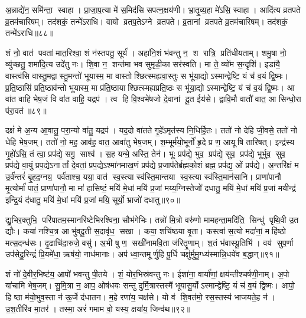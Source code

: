 अ॒न्नाद्ये॑न॒ समि॑न्ता॒ स्वाहा। प्रा॒जा॒प॒त्या मे॑ स॒मिद॑सि सपत्न॒क्षय॑णी। भ्रा॒तृ॒व्य॒हा मे॑ऽसि॒ स्वाहा। आदि॑त्य व्रतपते व्र॒तम॑चारिषम्। तद॑शकं॒ तन्मे॑ऽराधि। वायो व्रतप॒तेऽग्ने व्रतपते। व्र॒तानां व्रतपते व्र॒तम॑चारिषम्। तद॑शकं॒ तन्मे॑ऽराधि॥८८॥
\anuvakamend[स॒मित्समि॑न्धे व्र॒तं च॑रिष्या॒म्यायु॑षा॒ तेज॑सा॒ वर्च॑सा श्रि॒या यश॑सा ब्रह्मवर्च॒सेना॒ष्टौ च॑]


शं नो॒ वात॑ पवतां मात॒रिश्वा॒ शं न॑स्तपतु॒ सूर्य॑। अहा॑नि॒शं भ॑वन्तु न॒ श रात्रि॒ प्रति॑धीयताम्। शमु॒षा नो॒ व्यु॑च्छतु॒ शमा॑दि॒त्य उदे॑तु नः। शि॒वा न॒ शन्त॑मा भव सुमृडी॒का सर॑स्वति। मा ते॒ व्यो॑म स॒न्दृशि॑। इडा॑यै॒ वास्त्व॑सि वास्तु॒मद्वास्तु॒मन्तो॑ भूयास्म॒ मा वास्तोश्छित्स्मह्यवा॒स्तुः स भू॑या॒द्योऽस्मान्द्वेष्टि॒ यं च॑ व॒यं द्वि॒ष्मः। प्र॒ति॒ष्ठासि॑ प्रति॒ष्ठाव॑न्तो भूयास्म॒ मा प्र॑ति॒ष्ठायाश्छित्स्मह्यप्रति॒ष्ठः स भू॑या॒द्योऽस्मान्द्वेष्टि॒ यं च॑ व॒यं द्वि॒ष्मः। आ वा॑त वाहि भेष॒जं वि वा॑त वाहि॒ यद्रप॑। त्व हि वि॒श्वभे॑षजो दे॒वानां दू॒त ईय॑से। द्वावि॒मौ वातौ॑ वात॒ आ सिन्धो॒रा प॑रा॒वत॑॥८९॥

दक्षं॑ मे अ॒न्य आ॒वातु॒ परा॒न्यो वा॑तु॒ यद्रप॑। यद॒दो वा॑तते गृ॒हे॑ऽमृत॑स्य नि॒धिर्\mbox{}हि॒तः। ततो॑ नो देहि जी॒वसे॒ ततो॑ नो धेहि भेष॒जम्। ततो॑ नो॒ मह॒ आव॑ह॒ वात॒ आवा॑तु भेष॒जम्। श॒म्भूर्म॑यो॒भूर्नो॑ हृ॒दे प्र ण॒ आयूषि तारिषत्। इन्द्र॑स्य गृ॒हो॑ऽसि॒ तं त्वा॒ प्रप॑द्ये॒ सगु॒ साश्व॑। स॒ह यन्मे॒ अस्ति॒ तेन॑। भूः प्रप॑द्ये॒ भुव॒ प्रप॑द्ये॒ सुव॒ प्रप॑द्ये॒ भूर्भुव॒ सुव॒ प्रप॑द्ये वा॒युं प्रप॒द्येऽनार्तां दे॒वतां॒ प्रप॒द्येऽश्मा॑नमाख॒णं प्रप॑द्ये प्र॒जाप॑तेर्ब्रह्मको॒शं ब्रह्म॒ प्रप॑द्य॒ ओं प्रप॑द्ये। अ॒न्तरि॑क्षं म उ॒र्व॑न्तरं॑ बृ॒हद॒ग्नय॒ पर्व॑ताश्च॒ यया॒ वात॑ स्व॒स्त्या स्व॑स्ति॒मान्तया स्व॒स्त्या स्व॑स्ति॒मान॑सानि। प्राणा॑पानौ मृ॒त्योर्मा॑ पातं॒ प्राणा॑पानौ॒ मा मा॑ हासिष्टं॒ मयि॑ मे॒धां मयि॑ प्र॒जां मय्य॒ग्निस्तेजो॑ दधातु॒ मयि॑ मे॒धां मयि॑ प्र॒जां मयीन्द्र॑ इन्द्रि॒यं द॑धातु॒ मयि॑ मे॒धां मयि॑ प्र॒जां मयि॒ सूर्यो॒ भ्राजो॑ दधातु॥९०॥

द्यु॒भिर॒क्तुभि॒ परि॑पातम॒स्मानरि॑ष्टेभिरश्विना॒ सौभ॑गेभिः। तन्नो॑ मि॒त्रो वरु॑णो मामहन्ता॒मदि॑ति॒ सिन्धु॑ पृथि॒वी उ॒त द्यौः। कया॑ नश्चि॒त्र आ भु॑वदू॒ती स॒दावृ॑ध॒ सखा। कया॒ शचि॑ष्ठया वृ॒ता। कस्त्वा॑ स॒त्यो मदा॑नां॒ महि॑ष्ठो मत्स॒दन्ध॑सः। दृ॒ढाचि॑दा॒रुजे॒ वसु॑। अ॒भी षु ण॒ सखी॑नामवि॒ता ज॑रितॄ॒णाम्। श॒तं भ॑वास्यू॒तिभि॑। वय॑ सुप॒र्णा उप॑सेदु॒रिन्द्रं॑ प्रि॒यमे॑धा॒ ऋष॑यो॒ नाध॑मानाः। अप॑ ध्वा॒न्तमूर्णु॒हि पू॒र्धि चक्षु॑र्मुमु॒ग्ध्य॑स्मान्नि॒धये॑व ब॒द्धान्॥९१॥

शं नो॑ दे॒वीर॒भिष्ट॑य॒ आपो॑ भवन्तु पी॒तये। शं॒ योर॒भिस्र॑वन्तु नः। ईशा॑ना॒ वार्या॑णां॒ क्षय॑न्तीश्चर्\mbox{}षणी॒नाम्। अ॒पो या॑चामि भेष॒जम्। सु॒मि॒त्रा न॒ आप॒ ओष॑धयः सन्तु दुर्मि॒त्रास्तस्मै॑ भूयासु॒र्योऽस्मान्द्वेष्टि॒ यं च॑ व॒यं द्वि॒ष्मः। आपो॒ हि ष्ठा म॑यो॒भुव॒स्ता न॑ ऊ॒र्जे द॑धातन। म॒हे रणा॑य॒ चक्ष॑से। यो व॑ शि॒वत॑मो॒ रस॒स्तस्य॑ भाजयते॒ह न॑। उ॒श॒तीरि॑व मा॒तर॑। तस्मा॒ अरं॑ गमाम वो॒ यस्य॒ क्षया॑य॒ जिन्व॑थ॥९२॥

